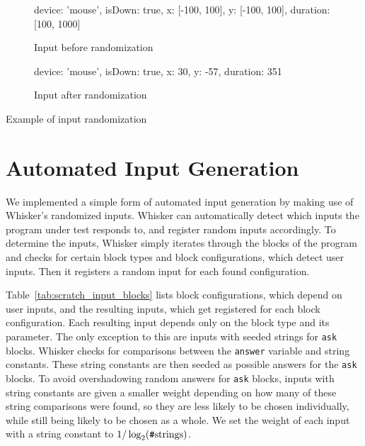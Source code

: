 \begin{listing}[htpb]
    \centering

    \begin{subfigure}[b]{.35\textwidth}
        \begin{javascriptcode}
            {
                device: 'mouse',
                isDown: true,
                x: [-100, 100],
                y: [-100, 100],
                duration: [100, 1000]
            }
        \end{javascriptcode}
        \vspace{-\bigskipamount}
        \caption{Input before randomization}
    \end{subfigure}
    \hspace{.08\textwidth}
    \begin{subfigure}[b]{.35\textwidth}
        \begin{javascriptcode}
            {
                device: 'mouse',
                isDown: true,
                x: 30,
                y: -57,
                duration: 351
            }
        \end{javascriptcode}
        \vspace{-\bigskipamount}
        \caption{Input after randomization}
    \end{subfigure}

    \caption{Example of input randomization}
    \label{fig:input_randomization_example}
\end{listing}

\section{Automated Input Generation}
\label{sec:automated_input_generation}

We implemented a simple form of automated input generation by making use of Whisker's randomized inputs.
Whisker can automatically detect which inputs the program under test responds to,
and register random inputs accordingly.
To determine the inputs,
Whisker simply iterates through the blocks of the program and checks for certain block types and block configurations,
which detect user inputs.
Then it registers a random input for each found configuration.
\parspace

Table~\ref{tab:scratch_input_blocks} lists block configurations, which depend on user inputs,
and the resulting inputs, which get registered for each block configuration.
Each resulting input depends only on the block type and its parameter.
The only exception to this are inputs with seeded strings for \texttt{ask} blocks.
Whisker checks for comparisons between the \texttt{answer} variable and string constants.
These string constants are then seeded as possible answers for the \texttt{ask} blocks.
To avoid overshadowing random answers for \texttt{ask} blocks,
inputs with string constants are given a smaller weight depending on how many of these string comparisons were found,
so they are less likely to be chosen individually, while still being likely to be chosen as a whole.
We set the weight of each input with a string constant to $1 / \log_2(\text{\texttt{\#}strings})$.


